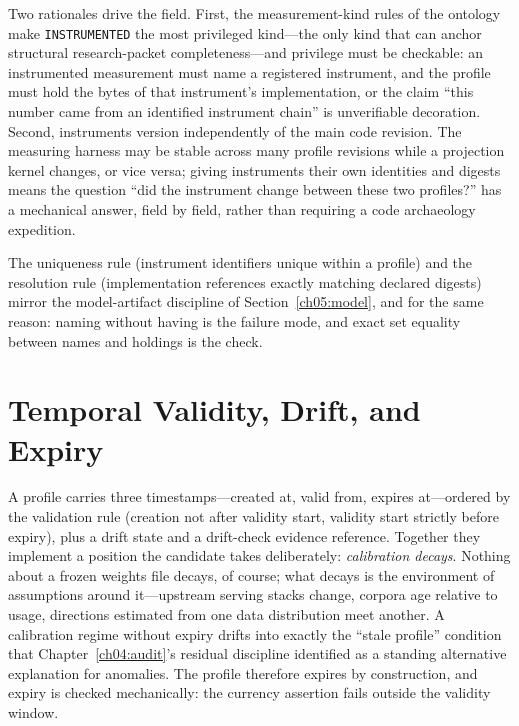 Two rationales drive the field. First, the measurement-kind rules of the
ontology make \texttt{INSTRUMENTED} the most privileged kind---the only kind
that can anchor structural research-packet completeness---and privilege must
be checkable: an instrumented measurement must name a registered instrument,
and the profile must hold the bytes of that instrument's implementation, or
the claim ``this number came from an identified instrument chain'' is
unverifiable decoration. Second, instruments version independently of the
main code revision. The measuring harness may be stable across many profile
revisions while a projection kernel changes, or vice versa; giving
instruments their own identities and digests means the question ``did the
instrument change between these two profiles?'' has a mechanical answer,
field by field, rather than requiring a code archaeology expedition.

The uniqueness rule (instrument identifiers unique within a profile) and
the resolution rule (implementation references exactly matching declared
digests) mirror the model-artifact discipline of
Section~\ref{ch05:model}, and for the same reason: naming without having is
the failure mode, and exact set equality between names and holdings is the
check.

\section{Temporal Validity, Drift, and Expiry}\label{ch05:drift}

A profile carries three timestamps---created at, valid from, expires
at---ordered by the validation rule (creation not after validity start,
validity start strictly before expiry), plus a drift state and a drift-check
evidence reference. Together they implement a position the candidate takes
deliberately: \emph{calibration decays}. Nothing about a frozen weights file
decays, of course; what decays is the environment of assumptions around
it---upstream serving stacks change, corpora age relative to usage,
directions estimated from one data distribution meet another. A calibration
regime without expiry drifts into exactly the ``stale profile'' condition
that Chapter~\ref{ch04:audit}'s residual discipline identified as a standing
alternative explanation for anomalies. The profile therefore expires by
construction, and expiry is checked mechanically: the currency assertion
fails outside the validity window.


